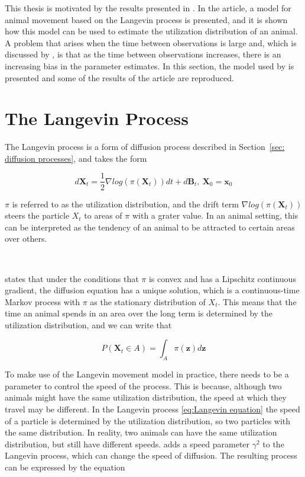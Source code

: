
\parencite{michelot_langevin_2019}


This thesis is motivated by the results presented in \parencite{michelot_langevin_2019}. In the article, a model for animal movement based on the Langevin process is presented, and it is shown how this model can be used to estimate the utilization distribution of an animal. A problem that arises when the time between observations is large and, which is discussed by \parencite{michelot_langevin_2019}, is that as the time between observations increases, there is an increasing bias in the parameter estimates. In this section, the model used by \parencite{michelot_langevin_2019} is presented and some of the results of the article are reproduced.



\section{The Langevin Process}
The Langevin process is a form of diffusion process described in Section~\ref{sec: diffusion processes}, and takes the form

\begin{equation}
    d\textbf{X}_t = \frac{1}{2} \nabla log(\pi(\textbf{X}_t))dt + d\textbf{B}_t, \ \textbf{X}_0 = \textbf{x}_0
    \label{eq:Langevin equation}
\end{equation}


$\pi$ is referred to as the utilization distribution, and the drift term $\nabla log(\pi(\textbf{X}_t))$ steers the particle $X_t$ to areas of $\pi$ with a grater value. In an animal setting, this can be interpreted as the tendency of an animal to be attracted to certain areas over others.

\

\parencite{dalalyan_theoretical_2017} states that under the conditions that $\pi$ is convex and has a Lipschitz continuous gradient, the diffusion equation has a unique solution, which is a continuous-time Markov process with $\pi$ as the stationary distribution of $X_t$. This means that the time an animal spends in an area over the long term is determined by the utilization distribution, and we can write that

\begin{equation}
    P(\textbf{X}_t \in A ) = \int_A \pi(\textbf{z})d\textbf{z}
\end{equation}


To make use of the Langevin movement model in practice, there needs to be a parameter to control the speed of the process. This is because, although two animals might have the same utilization distribution, the speed at which they travel may be different. In the Langevin process \eqref{eq:Langevin equation} the speed of a particle is determined by the utilization distribution, so two particles with the same distribution. In reality, two animals can have the same utilization distribution, but still have different speeds. \parencite{roberts_optimal_1998} adds a speed parameter $\gamma^2$ to the Langevin process, which can change the speed of diffusion. The resulting process can be expressed by the equation

